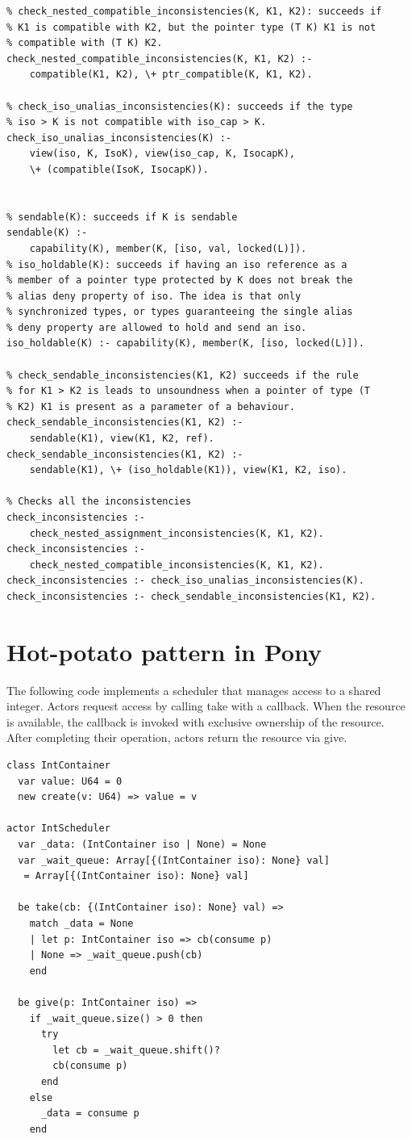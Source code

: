 \begin{verbatim}
% check_nested_compatible_inconsistencies(K, K1, K2): succeeds if 
% K1 is compatible with K2, but the pointer type (T K) K1 is not 
% compatible with (T K) K2.
check_nested_compatible_inconsistencies(K, K1, K2) :- 
    compatible(K1, K2), \+ ptr_compatible(K, K1, K2).

% check_iso_unalias_inconsistencies(K): succeeds if the type 
% iso > K is not compatible with iso_cap > K.
check_iso_unalias_inconsistencies(K) :- 
    view(iso, K, IsoK), view(iso_cap, K, IsocapK), 
    \+ (compatible(IsoK, IsocapK)).


% sendable(K): succeeds if K is sendable
sendable(K) :- 
    capability(K), member(K, [iso, val, locked(L)]).
% iso_holdable(K): succeeds if having an iso reference as a 
% member of a pointer type protected by K does not break the
% alias deny property of iso. The idea is that only 
% synchronized types, or types guaranteeing the single alias
% deny property are allowed to hold and send an iso.
iso_holdable(K) :- capability(K), member(K, [iso, locked(L)]).

% check_sendable_inconsistencies(K1, K2) succeeds if the rule 
% for K1 > K2 is leads to unsoundness when a pointer of type (T 
% K2) K1 is present as a parameter of a behaviour. 
check_sendable_inconsistencies(K1, K2) :- 
    sendable(K1), view(K1, K2, ref).
check_sendable_inconsistencies(K1, K2) :- 
    sendable(K1), \+ (iso_holdable(K1)), view(K1, K2, iso).

% Checks all the inconsistencies
check_inconsistencies :- 
    check_nested_assignment_inconsistencies(K, K1, K2).
check_inconsistencies :- 
    check_nested_compatible_inconsistencies(K, K1, K2).
check_inconsistencies :- check_iso_unalias_inconsistencies(K).
check_inconsistencies :- check_sendable_inconsistencies(K1, K2).
\end{verbatim}

\chapter{Hot-potato pattern in Pony} \label{appendix:hot-potato}
The following code implements a scheduler that manages access to a shared integer. Actors request access by calling \textsf{take} with a callback. When the resource is available, the callback is invoked with exclusive ownership of the resource. After completing their operation, actors return the resource via \textsf{give}.
\begin{verbatim}
class IntContainer
  var value: U64 = 0
  new create(v: U64) => value = v

actor IntScheduler
  var _data: (IntContainer iso | None) = None
  var _wait_queue: Array[{(IntContainer iso): None} val]
   = Array[{(IntContainer iso): None} val]

  be take(cb: {(IntContainer iso): None} val) =>
    match _data = None
    | let p: IntContainer iso => cb(consume p)
    | None => _wait_queue.push(cb)
    end

  be give(p: IntContainer iso) =>
    if _wait_queue.size() > 0 then
      try
        let cb = _wait_queue.shift()?
        cb(consume p)
      end
    else
      _data = consume p
    end
\end{verbatim}

